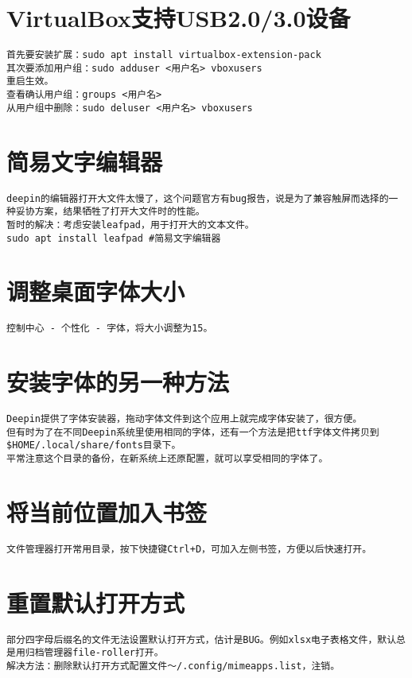 \documentclass[a4paper,fontset=fandol,zihao=-4,linespread=1.2,oneside]{ctexbook}
\begin{document}
\section{VirtualBox支持USB2.0/3.0设备}
\begin{lstlisting}
首先要安装扩展：sudo apt install virtualbox-extension-pack
其次要添加用户组：sudo adduser <用户名> vboxusers
重启生效。
查看确认用户组：groups <用户名>
从用户组中删除：sudo deluser <用户名> vboxusers
\end{lstlisting}

\section{简易文字编辑器}
\begin{lstlisting}
deepin的编辑器打开大文件太慢了，这个问题官方有bug报告，说是为了兼容触屏而选择的一种妥协方案，结果牺牲了打开大文件时的性能。
暂时的解决：考虑安装leafpad，用于打开大的文本文件。
sudo apt install leafpad #简易文字编辑器
\end{lstlisting}

\section{调整桌面字体大小}
\begin{lstlisting}
控制中心 - 个性化 - 字体，将大小调整为15。
\end{lstlisting}

\section{安装字体的另一种方法}
\begin{lstlisting}
Deepin提供了字体安装器，拖动字体文件到这个应用上就完成字体安装了，很方便。
但有时为了在不同Deepin系统里使用相同的字体，还有一个方法是把ttf字体文件拷贝到$HOME/.local/share/fonts目录下。
平常注意这个目录的备份，在新系统上还原配置，就可以享受相同的字体了。
\end{lstlisting}

\section{将当前位置加入书签}
\begin{lstlisting}
文件管理器打开常用目录，按下快捷键Ctrl+D，可加入左侧书签，方便以后快速打开。
\end{lstlisting}

\section{重置默认打开方式}
\begin{lstlisting}
部分四字母后缀名的文件无法设置默认打开方式，估计是BUG。例如xlsx电子表格文件，默认总是用归档管理器file-roller打开。
解决方法：删除默认打开方式配置文件～/.config/mimeapps.list，注销。
\end{lstlisting}
\end{document}
